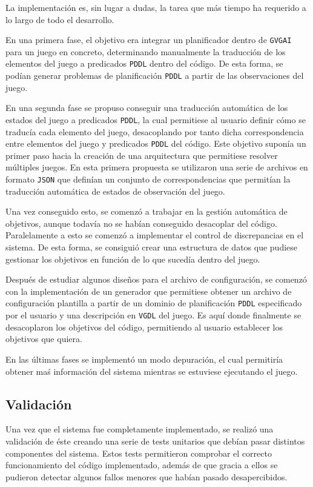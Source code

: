 La implementación es, sin lugar a dudas, la tarea que más tiempo ha requerido a lo largo de
todo el desarrollo.

En una primera fase, el objetivo era integrar un planificador dentro de \texttt{GVGAI} para un
juego en concreto, determinando manualmente la traducción de los elementos del juego a predicados
\texttt{PDDL} dentro del código. De esta forma, se podían generar problemas de planificación \texttt{PDDL}
a partir de las observaciones del juego.

En una segunda fase se propuso conseguir una traducción automática de los estados del juego
a predicados \texttt{PDDL}, la cual permitiese al usuario definir cómo se traducía cada elemento
del juego, desacoplando por tanto dicha correspondencia entre elementos del juego y predicados \texttt{PDDL}
del código. Este objetivo suponía un primer paso hacia la creación de una arquitectura que permitiese
resolver múltiples juegos. En esta primera propuesta se utilizaron una serie de archivos en formato
\texttt{JSON} que definían un conjunto de correspondencias que permitían la traducción automática
de estados de observación del juego.

Una vez conseguido esto, se comenzó a trabajar en la gestión automática de objetivos, aunque todavía no
se habían conseguido desacoplar del código. Paralelamente a esto se comenzó a implementar el control de
discrepancias en el sistema. De esta forma, se consiguió crear una estructura de datos que pudiese
gestionar los objetivos en función de lo que sucedía dentro del juego.

Después de estudiar algunos diseños para el archivo de configuración, se comenzó con la implementación
de un generador que permitiese obtener un archivo de configuración plantilla a partir de un dominio
de planificación \texttt{PDDL} especificado por el usuario y una descripción en \texttt{VGDL} del
juego. Es aquí donde finalmente se desacoplaron los objetivos del código, permitiendo al usuario
establecer los objetivos que quiera.

En las últimas fases se implementó un modo depuración, el cual permitiría obtener maś información
del sistema mientras se estuviese ejecutando el juego.

\subsection{Validación}

Una vez que el sistema fue completamente implementado, se realizó una validación de éste creando
una serie de tests unitarios que debían pasar distintos componentes del sistema. Estos tests permitieron
comprobar el correcto funcionamiento del código implementado, además de que gracia a ellos se pudieron
detectar algunos fallos menores que habían pasado desapercibidos.

